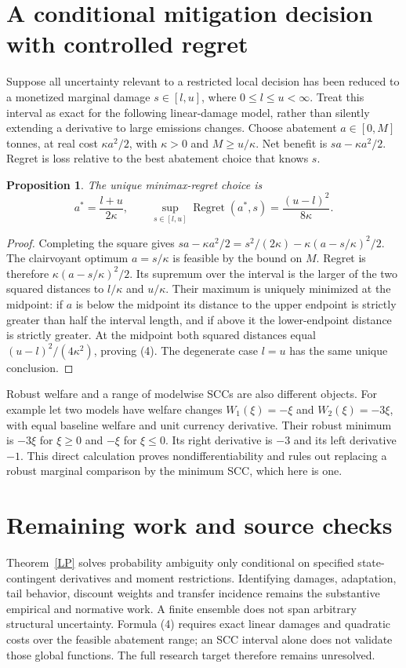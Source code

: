 \documentclass[11pt]{article}
\newtheorem{proposition}[theorem]{Proposition}
\begin{document}
\section{A conditional mitigation decision with controlled regret}
Suppose all uncertainty relevant to a restricted local decision has been
reduced to a monetized marginal damage $s\in[l,u]$, where
$0\leq l\leq u<\infty$. Treat this interval as exact for the following
linear-damage model, rather than silently extending a derivative to large
emissions changes. Choose abatement $a\in[0,M]$ tonnes, at real cost
$\kappa a^2/2$, with $\kappa>0$ and $M\geq u/\kappa$. Net benefit is
$sa-\kappa a^2/2$. Regret is loss relative to the best abatement choice
that knows $s$.
\begin{proposition}\label{regret}
The unique minimax-regret choice is
\[
 a^*=\frac{l+u}{2\kappa},\qquad
 \sup_{s\in[l,u]}\operatorname{Regret}(a^*,s)
       =\frac{(u-l)^2}{8\kappa}.                              \tag{4}
\]
\end{proposition}
\begin{proof}
Completing the square gives
$sa-\kappa a^2/2=s^2/(2\kappa)-\kappa(a-s/\kappa)^2/2$.
The clairvoyant optimum $a=s/\kappa$ is feasible by the bound on $M$.
Regret is therefore $\kappa(a-s/\kappa)^2/2$. Its supremum over the
interval is the larger of the two squared distances to $l/\kappa$ and
$u/\kappa$. Their maximum is uniquely minimized at the midpoint:
if $a$ is below the midpoint its distance to the upper endpoint is
strictly greater than half the interval length, and if above it the
lower-endpoint distance is strictly greater. At the midpoint both
squared distances equal $(u-l)^2/(4\kappa^2)$, proving (4).
The degenerate case $l=u$ has the same unique conclusion.
\end{proof}
Robust welfare and a range of modelwise SCCs are also different objects.
For example let two models have welfare changes $W_1(\xi)=-\xi$ and
$W_2(\xi)=-3\xi$, with equal baseline welfare and unit currency derivative.
Their robust minimum is $-3\xi$ for $\xi\geq0$ and $-\xi$ for
$\xi\leq0$. Its right derivative is $-3$ and its left derivative $-1$.
This direct calculation proves nondifferentiability and rules out replacing
a robust marginal comparison by the minimum SCC, which here is one.

\section{Remaining work and source checks}
Theorem~\ref{LP} solves probability ambiguity only conditional on specified
state-contingent derivatives and moment restrictions. Identifying damages,
adaptation, tail behavior, discount weights and transfer incidence remains
the substantive empirical and normative work. A finite ensemble does not
span arbitrary structural uncertainty. Formula (4) requires exact linear
damages and quadratic costs over the feasible abatement range; an SCC
interval alone does not validate those global functions. The full research
target therefore remains unresolved.
\end{document}
